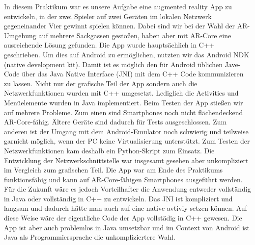 In diesem Praktikum war es unsere Aufgabe eine augmented reality App zu entwickeln,
in der zwei Spieler auf zwei Geräten im lokalen Netzwerk gegeneinander
Vier gewinnt spielen können. Dabei sind wir bei der Wahl der AR-Umgebung auf mehrere Sackgassen
gestoßen, haben aber mit AR-Core eine ausreichende Lösung gefunden. Die App wurde hauptsächlich in C++ geschrieben.
Um dies auf Android zu ermöglichen, nutzten wir das Android NDK (native development kit). Damit ist es möglich
den für Android üblichen Jave-Code über das Java Native Interface (JNI) mit dem C++ Code kommunizieren
zu lassen. Nicht nur der grafische Teil der App sondern auch die Netzwerkfunktionen wurden mit C++ umgesetzt.
Lediglich die Activities und Menüelemente wurden in Java implementiert.
Beim Testen der App stießen wir auf mehrere Probleme. Zum einen sind Smartphones noch nicht flächendeckend
AR-Core-fähig. Ältere Geräte sind dadurch für Tests ausgeschlossen. Zum anderen ist der Umgang mit dem Android-Emulator
noch schwierig und teilweise garnicht möglich, wenn der PC keine Virtualisierung unterstützt.
Zum Testen der Netzwerkfunktionen kam deshalb ein Python-Skript zum Einsatz.
Die Entwicklung der Netzwerkschnittstelle war insgesamt gesehen aber unkompliziert im Vergleich zum grafischen Teil.
Die App war am Ende des Praktikums funktionsfähig und kann auf AR-Core-fähigen Smartphones ausgeführt werden.
Für die Zukunft wäre es jedoch Vorteilhafter die Anwendung entweder vollständig in Java oder vollständig in C++
zu entwickeln. Das JNI ist kompliziert und langsam und dadurch hätte man auch auf eine native avtiviy setzen können.
Auf diese Weise wäre der eigentliche Code der App vollstädig in C++ gewesen. Die App ist aber auch
problemlos in Java umsetzbar und im Context von Android ist Java als Programmiersprache die unkompliziertere Wahl.
